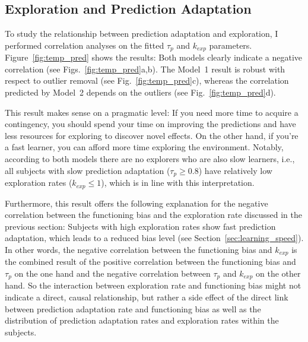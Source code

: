 \documentclass[a4paper]{scrreprt}
\begin{document}
\clearpage

\subsection{Exploration and Prediction Adaptation}
\label{sec:exploration_and_prediction_adaptation}

To study the relationship between prediction adaptation and exploration, I performed correlation analyses on the fitted $\tau_p$ and $k_{exp}$ parameters. Figure~\ref{fig:temp_pred} shows the results: Both models clearly indicate a negative correlation (see Figs.~\ref{fig:temp_pred}a,b). The Model~1 result is robust with respect to outlier removal (see Fig.~\ref{fig:temp_pred}c), whereas the correlation predicted by Model~2 depends on the outliers (see Fig.~\ref{fig:temp_pred}d).

This result makes sense on a pragmatic level: If you need more time to acquire a contingency, you should spend your time on improving the predictions and have less resources for exploring to discover novel effects. On the other hand, if you're a fast learner, you can afford more time exploring the environment. Notably, according to both models there are no explorers who are also slow learners, i.e., all subjects with slow prediction adaptation ($\tau_p \ge 0.8$) have relatively low exploration rates ($k_{exp} \le 1$), which is in line with this interpretation.

Furthermore, this result offers the following explanation for the negative correlation between the functioning bias and the exploration rate discussed in the previous section: Subjects with high exploration rates show fast prediction adaptation, which leads to a reduced bias level (see Section~\ref{sec:learning_speed}). In other words, the negative correlation between the functioning bias and $k_{exp}$ is the combined result of the positive correlation between the functioning bias and $\tau_p$ on the one hand and the negative correlation between $\tau_p$ and $k_{exp}$ on the other hand. So the interaction between exploration rate and functioning bias might not indicate a direct, causal relationship, but rather a side effect of the direct link between prediction adaptation rate and functioning bias as well as the distribution of prediction adaptation rates and exploration rates within the subjects.
\end{document}
